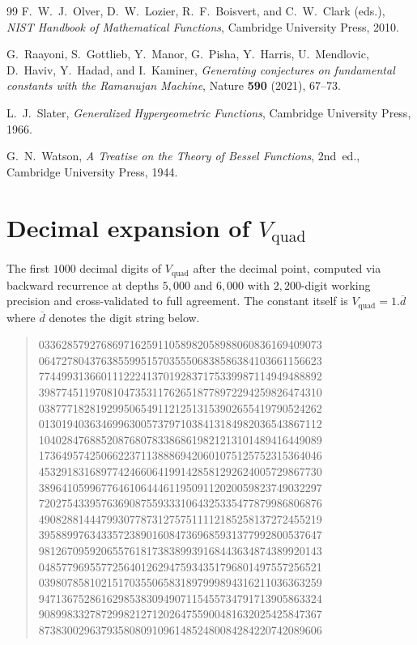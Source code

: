 \documentclass[11pt,a4paper]{article}
\theoremstyle{definition}
\theoremstyle{remark}
\newcommand{\Vq}{V_{\mathrm{quad}}}
\begin{document}
\begin{thebibliography}{99}
F.~W.~J.~Olver, D.~W.~Lozier, R.~F.~Boisvert, and C.~W.~Clark (eds.),
\emph{NIST Handbook of Mathematical Functions},
Cambridge University Press, 2010.

G.~Raayoni, S.~Gottlieb, Y.~Manor, G.~Pisha, Y.~Harris, U.~Mendlovic,
D.~Haviv, Y.~Hadad, and I.~Kaminer,
\emph{Generating conjectures on fundamental constants with the Ramanujan
Machine},
Nature \textbf{590} (2021), 67--73.

L.~J.~Slater,
\emph{Generalized Hypergeometric Functions},
Cambridge University Press, 1966.

G.~N.~Watson,
\emph{A Treatise on the Theory of Bessel Functions}, 2nd~ed.,
Cambridge University Press, 1944.

\end{thebibliography}


\appendix
\section{Decimal expansion of $\Vq$}\label{app:digits}

The first $1000$ decimal digits of $\Vq$ after the decimal point,
computed via backward recurrence at depths $5{,}000$ and $6{,}000$
with $2{,}200$-digit working precision and cross-validated to full
agreement.  The constant itself is $\Vq = 1.\overline{d}$ where
$\overline{d}$ denotes the digit string below.

\begin{quote}
\ttfamily\small{}%
03362857927686971625911058982058988060836169409073%
06472780437638559951570355506838586384103661156623%
77449931366011122241370192837175339987114949488892%
39877451197081047353117626518778972294259826474310%
03877718281929950654911212513153902655419790524262%
01301940363469963005737971038413184982036543867112%
10402847688520876807833868619821213101489416449089%
17364957425066223711388869420601075125752315364046%
45329183168977424660641991428581292624005729867730%
38964105996776461064446119509112020059823749032297%
72027543395763690875593331064325335477879986806876%
49082881444799307787312757511112185258137272455219%
39588997634335723890160847369685931377992800537647%
98126709592065576181738389939168443634874389920143%
04857796955772564012629475934351796801497557256521%
03980785810215170355065831897999894316211036363259%
94713675286162985383094907115455734791713905863324%
90899833278729982127120264755900481632025425847367%
87383002963793580809109614852480084284220742089606
\end{quote}
\end{document}
